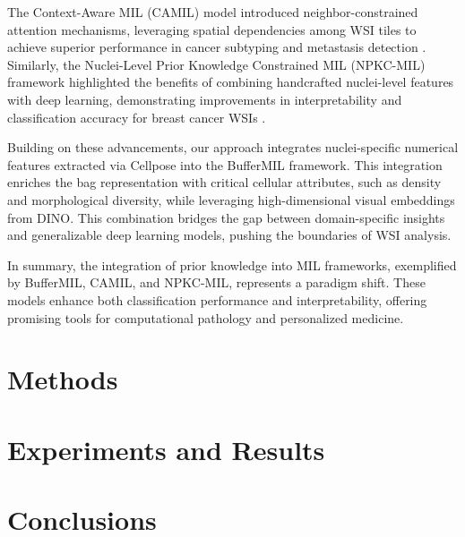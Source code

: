 \documentclass[10pt,twocolumn]{article}
\begin{document}
The Context-Aware MIL (CAMIL) model introduced neighbor-constrained attention mechanisms, leveraging spatial dependencies among WSI tiles to achieve superior performance in cancer subtyping and metastasis detection \cite{fourkioti2023camil}. Similarly, the Nuclei-Level Prior Knowledge Constrained MIL (NPKC-MIL) framework highlighted the benefits of combining handcrafted nuclei-level features with deep learning, demonstrating improvements in interpretability and classification accuracy for breast cancer WSIs \cite{WANG2024109826}.

Building on these advancements, our approach integrates nuclei-specific numerical features extracted via Cellpose into the BufferMIL framework. This integration enriches the bag representation with critical cellular attributes, such as density and morphological diversity, while leveraging high-dimensional visual embeddings from DINO. This combination bridges the gap between domain-specific insights and generalizable deep learning models, pushing the boundaries of WSI analysis.

In summary, the integration of prior knowledge into MIL frameworks, exemplified by BufferMIL, CAMIL, and NPKC-MIL, represents a paradigm shift. These models enhance both classification performance and interpretability, offering promising tools for computational pathology and personalized medicine.

\section{Methods} \label{methods}

\section{Experiments and Results} \label{results}

\section{Conclusions} \label{conclusions}



\end{document}
